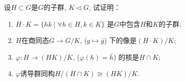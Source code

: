 \begin{solution}
    
\end{solution}

\begin{problem}
    设$H \subset G$是$G$的子群, $K \lhd G$, 试证明：
\begin{enumerate}[(1)]
    \item $H \cdot K = \{hk \mid \forall h \in H, k \in K\}$
是$G$中包含$H$和$K$的子群;
    \item $H$在商同态$G \to G/K$, ($g \mapsto \bar{g}$)
下的像是$(H \cdot K)/K$;
    \item $\varphi:H \to (HK)/K$, ($\varphi(h) = \bar{h}$)
的核是$H \cap K$;
    \item $\varphi$诱导群同构$H/(H \cap K) \cong (HK)/K$.
\end{enumerate}
\end{problem}

\begin{solution}
    
\end{solution}